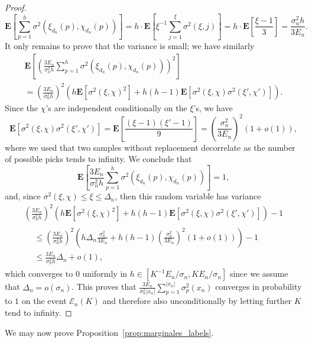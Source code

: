 \documentclass[10pt]{amsart}
\theoremstyle{definition}\newtheorem{defi}[theo]{Definition}\newtheorem{rema}[theo]{Remark}\newtheorem{exam}[theo]{Example}\newtheorem{exem}[theo]{Example}\newtheorem{nota}[theo]{Notation}
\newcommand{\ensembles}[1]{\mathbf{#1}}
\newcommand{\E}{\ensembles{E}}
\newcommand{\Es}[1]{\E\left[#1\right]}
\newcommand{\1}{\ensembles{1}}
\renewcommand{\le}{\leqslant}
\newcommand{\clE}{\mathcal{E}}
\newcommand{\edges}{E}
\providecommand{\?}{}
\begin{document}
\begin{proof}
\[
\Es{\sum_{p = 1}^h \sigma^2\left(\xi_{d_n}(p), \chi_{d_n}(p)\right)} = h \cdot \Es{\xi^{-1} \sum_{j=1}^\xi \sigma^2(\xi,j)} = h \cdot \Es{\frac{\xi-1}{3}} = \frac{\sigma_n^2 h}{3 \edges_n}.
\]
It only remains to prove that the variance is small; we have similarly
\begin{multline*}
\Es{\left(\frac{3 \edges_n}{\sigma_n^2 h} \sum_{p = 1}^h \sigma^2\left(\xi_{d_n}(p), \chi_{d_n}(p)\right)\right)^2}
\\=\left(\frac{3 \edges_n}{\sigma_n^2 h}\right)^2 \left(h \Es{\sigma^2(\xi, \chi)^2} + h(h-1) \Es{\sigma^2(\xi, \chi) \sigma^2\left(\xi', \chi'\right)}\right).
\end{multline*}
Since the $\chi$'s are independent conditionally on the $\xi$'s, we have
\[
\Es{\sigma^2(\xi, \chi) \sigma^2\left(\xi', \chi'\right)} = \Es{\frac{(\xi-1)\left(\xi'-1\right)}{9}} = \left(\frac{\sigma_n^2}{3 \edges_n}\right)^2 (1+o(1)),
\]
where we used that two samples without replacement decorrelate as the number of possible picks tends to infinity. We conclude that
\[
\Es{\frac{3 \edges_n}{\sigma_n^2 h} \sum_{p = 1}^h \sigma^2\left(\xi_{d_n}(p), \chi_{d_n}(p)\right)} = 1,
\]
and, since $\sigma^2(\xi, \chi) \le \xi \le \Delta_n$, then this random variable has variance
\begin{multline*}
\left(\frac{3 \edges_n}{\sigma_n^2 h}\right)^2 \left(h \Es{\sigma^2(\xi, \chi)^2} + h(h-1) \Es{\sigma^2(\xi, \chi) \sigma^2\left(\xi', \chi'\right)}\right) - 1
\\
\begin{aligned}
&\le \left(\frac{3 \edges_n}{\sigma_n^2 h}\right)^2 \left(h \Delta_n \frac{\sigma_n^2}{3 \edges_n} + h(h-1) \left(\frac{\sigma_n^2}{3 \edges_n}\right)^2 (1+o(1))\right) - 1
\\
&\le \frac{3 \edges_n}{\sigma_n^2 h} \Delta_n + o(1),
\end{aligned}
\end{multline*}
which converges to $0$ uniformly in $h \in [K^{-1} \edges_n / \sigma_n, K \edges_n / \sigma_n]$ since we assume that $\Delta_n = o(\sigma_n)$. This proves that $\tfrac{3 \edges_n}{\sigma_n^2 |x_n|} \sum_{p = 1}^{|x_n|} \sigma^2_p(x_n)$ converges in probability to $1$ on the event $\clE_n(K)$ and therefore also unconditionally by letting further $K$ tend to infinity.
\end{proof}



We may now prove Proposition~\ref{prop:marginales_labels}.
\end{document}
